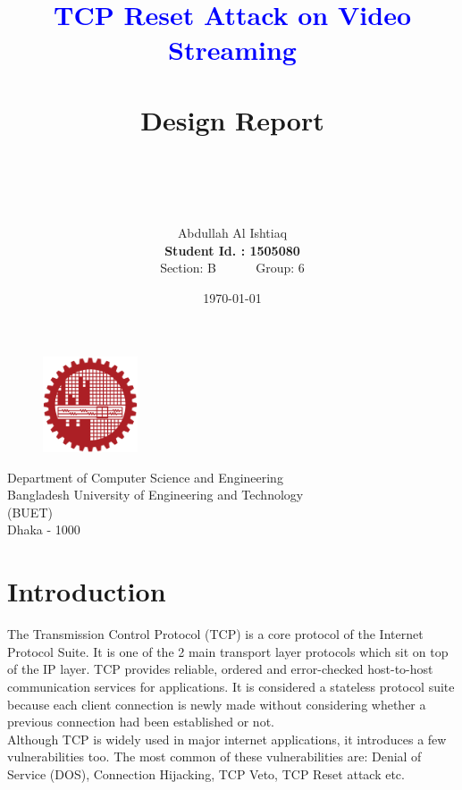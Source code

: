\documentclass[14pt]{extarticle}
\title{\Huge{\textcolor{blue}{TCP Reset Attack on Video Streaming}} \\ ~\\
        \LARGE{Design Report} \\ ~ \\ ~ \\ }
\author{Abdullah Al Ishtiaq \\
        \textbf{Student Id. : 1505080} \\ 
        Section: B ~~~~~ Group: 6}
\date{\today}
\begin{document}
\maketitle

\vspace{1cm}

\begin{figure}[h!]
\centering
    \includegraphics[width = 0.25\textwidth]{Pictures/logoBUET.png}
\end{figure}
\begin{center}
\vspace{.5cm}

\Large{Department of Computer Science and Engineering \\
    Bangladesh University of Engineering and Technology \\
    (BUET) \\
    Dhaka - 1000 }

\end{center}

\newpage

\tableofcontents
\newpage



\section{Introduction}
    The Transmission Control Protocol (TCP) is a core protocol of the Internet Protocol Suite. It is one of the 2 main transport layer protocols which sit on top of the IP layer. TCP provides reliable, ordered and error-checked host-to-host communication services for applications. It is considered a stateless protocol suite because each client connection is newly made without considering whether a previous connection had been established or not. \\
    Although TCP is widely used in major internet applications, it introduces a few vulnerabilities too. The most common of these vulnerabilities are: Denial of Service (DOS), Connection Hijacking, TCP Veto, TCP Reset attack etc.
\end{document}
